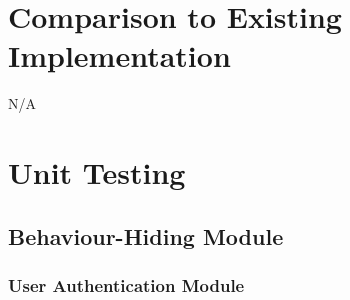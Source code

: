 \documentclass[12pt, titlepage]{article}
\begin{document}
\section{Comparison to Existing Implementation}	

N/A

\section{Unit Testing}

\subsection{Behaviour-Hiding Module}

\subsubsection{User Authentication Module}
\end{document}
